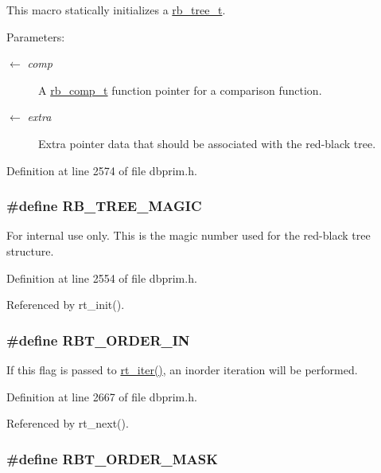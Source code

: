This macro statically initializes a \hyperlink{group__dbprim__rbtree_ga0}{rb\_\-tree\_\-t}.

\begin{Desc}
\item[Parameters:]
\begin{description}
\item[\mbox{$\leftarrow$} {\em comp}]A \hyperlink{group__dbprim__rbtree_ga3}{rb\_\-comp\_\-t} function pointer for a comparison function. \item[\mbox{$\leftarrow$} {\em extra}]Extra pointer data that should be associated with the red-black tree.\end{description}
\end{Desc}


Definition at line 2574 of file dbprim.h.\hypertarget{group__dbprim__rbtree_ga17}{
\subsubsection[RB\_\-TREE\_\-MAGIC]{\setlength{\rightskip}{0pt plus 5cm}\#define RB\_\-TREE\_\-MAGIC}}
\label{group__dbprim__rbtree_ga17}


\begin{Desc}
\item[For internal use only.]
This is the magic number used for the red-black tree structure.\end{Desc}


Definition at line 2554 of file dbprim.h.

Referenced by rt\_\-init().\hypertarget{group__dbprim__rbtree_ga26}{
\subsubsection[RBT\_\-ORDER\_\-IN]{\setlength{\rightskip}{0pt plus 5cm}\#define RBT\_\-ORDER\_\-IN}}
\label{group__dbprim__rbtree_ga26}


If this flag is passed to \hyperlink{group__dbprim__rbtree_ga12}{rt\_\-iter()}, an inorder iteration will be performed.

Definition at line 2667 of file dbprim.h.

Referenced by rt\_\-next().\hypertarget{group__dbprim__rbtree_ga28}{
\subsubsection[RBT\_\-ORDER\_\-MASK]{\setlength{\rightskip}{0pt plus 5cm}\#define RBT\_\-ORDER\_\-MASK}}
\label{group__dbprim__rbtree_ga28}



